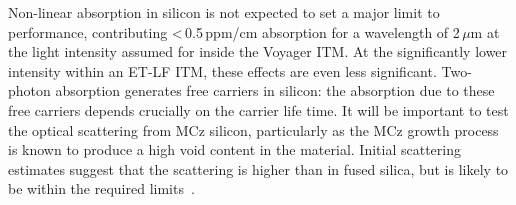Non-linear absorption in silicon is not expected to set a major limit to performance, contributing <\,0.5\,ppm/cm absorption for a wavelength of 2\,$\mu$m at the light intensity assumed for inside the \ac{Voyager} \ac{ITM}. At the significantly lower intensity within an \ac{ET-LF}   \ac{ITM}, these effects are even less significant. 
Two-photon absorption generates free carriers in silicon: the absorption due to these free carriers depends crucially on the carrier life time. 
It will be important to test the optical scattering from \ac{MCz}   silicon, particularly as the \ac{MCz}   growth process is known to produce a high void content in the material. 
Initial scattering estimates
suggest that the scattering is higher than in fused silica, but is likely to be within the required limits~\cite{SiliconScatter2017}.

